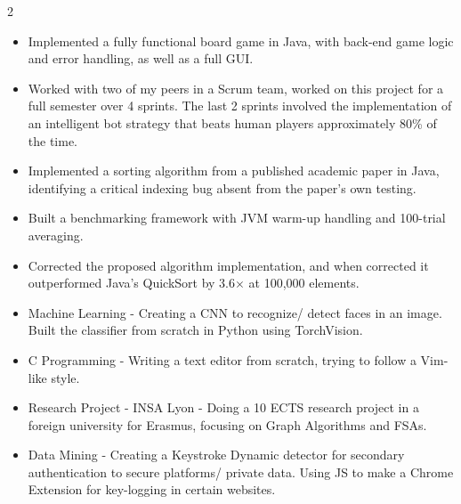 \documentclass[10pt,a4paper,withhyper]{altacv}
\begin{document}
\begin{paracol}{2}


\begin{itemize}
\item Implemented a fully functional board game in Java, with back-end game logic and error handling, as well as a full GUI.
\item Worked with two of my peers in a Scrum team, worked on this project for a full semester over 4 sprints. The last 2 sprints involved the implementation of an intelligent bot strategy that beats human players approximately 80\% of the time.
\end{itemize}

\divider
{}
\begin{itemize}
    \item Implemented a sorting algorithm from a published academic paper in Java, identifying a critical indexing bug absent from the paper's own testing.
    \item Built a benchmarking framework with JVM warm-up handling and 100-trial averaging.
    \item Corrected the proposed algorithm implementation, and when corrected it outperformed Java's QuickSort by 3.6$\times$ at 100,000 elements.
\end{itemize}
\divider

\begin{itemize}
    \item Machine Learning - Creating a CNN to recognize/ detect faces in an image. Built the classifier from scratch in Python using TorchVision.
    \item C Programming - Writing a text editor from scratch, trying to follow a Vim-like style.
    \item Research Project - INSA Lyon - Doing a 10 ECTS research project in a foreign university for Erasmus, focusing on Graph Algorithms and FSAs.
    \item Data Mining - Creating a Keystroke Dynamic detector for secondary authentication to secure platforms/ private data. Using JS to make a Chrome Extension for key-logging in certain websites.
\end{itemize}


\end{paracol}
\end{document}

